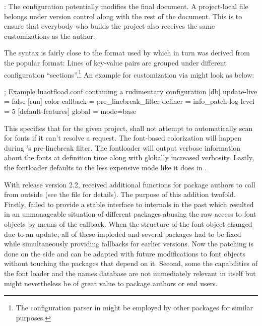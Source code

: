 \beginnarrower
  : The configuration potentially modifies the final
  document. A project-local file belongs under version control along
  with the rest of the document. This is to ensure that everybody who
  builds the project also receives the same customizations as the
  author.
\endnarrower

The syntax is fairly close to the format used by
 which in turn was derived from the popular
 format: Lines of key-value pairs are grouped under
different configuration “sections”.\footnote{%
  The configuration parser in  might
  be employed by other packages for similar purposes.
}
An example for customization via  might look
as below:

\beginlisting
; Example luaotfload.conf containing a rudimentary configuration
[db]
  update-live = false
[run]
  color-callback = pre_linebreak_filter
  definer = info_patch
  log-level = 5
[default-features]
  global = mode=base
\endlisting

This specifies that for the given project, 
shall not attempt to automatically scan for fonts if it can’t resolve a
request. The font-based colorization will happen during \LUATEX’s
pre-linebreak filter. The fontloader will output verbose information
about the fonts at definition time along with globally increased
verbosity. Lastly, the fontloader defaults to the less expensive
 mode like it does in \CONTEXT.


With release version 2.2,  received
additional functions for package authors to call from outside
(see the file  for details).
%
The purpose of this addition twofold.
%
Firstly,  failed to provide a stable interface
to internals in the past which resulted in an unmanageable situation
of different packages abusing the raw access to font objects by means
of the  callback.
%
When the structure of the font object changed due to an update, all
of these imploded and several packages had to be fixed while
simultaneously providing fallbacks for earlier versions.
%
Now the patching is done on the  side and can
be adapted with future modifications to font objects without touching
the packages that depend on it.
%
Second, some the capabilities of the font loader and the names
database are not immediately relevant in 
itself but might nevertheless be of great value to package authors or
end users.

